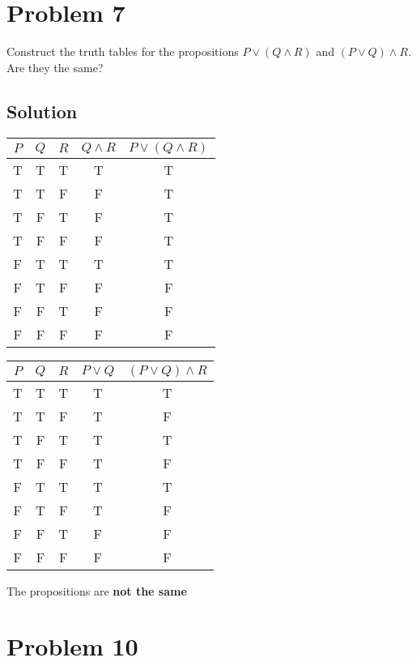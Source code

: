 \documentclass[12pt]{extarticle}
\begin{document}
\section*{Problem 7}

Construct the truth tables for the propositions $P \lor (Q \land R)$ and $(P \lor Q) \land R$. Are they the same?

\subsection*{Solution}

\begin{minipage}[c]{0.5\textwidth}
	\centering
	\begin{tabular}{ccc | c || c}
		$P$ & $Q$ & $R$ & $Q\land R$ & $P \lor (Q \land R)$ \\\hline
		T & T & T & T & T \\ 
		T & T & F & F & T \\ 
		T & F & T & F & T \\ 
		T & F & F & F & T \\ 
		F & T & T & T & T \\ 
		F & T & F & F & F \\ 
		F & F & T & F & F \\ 
		F & F & F & F & F \\ 
	\end{tabular}
\end{minipage}
\begin{minipage}[c]{0.5\textwidth}
	\centering
	\begin{tabular}{ccc | c || c}
		$P$ & $Q$ & $R$ & $P \lor Q$ & $(P \lor Q) \land R$ \\\hline
		T & T & T & T & T \\ 
		T & T & F & T & F \\ 
		T & F & T & T & T \\ 
		T & F & F & T & F \\ 
		F & T & T & T & T \\ 
		F & T & F & T & F \\ 
		F & F & T & F & F \\ 
		F & F & F & F & F \\ 
	\end{tabular}
\end{minipage}
\vspace{1cm}

The propositions are \textbf{not the same}

\section*{Problem 10}
\end{document}
